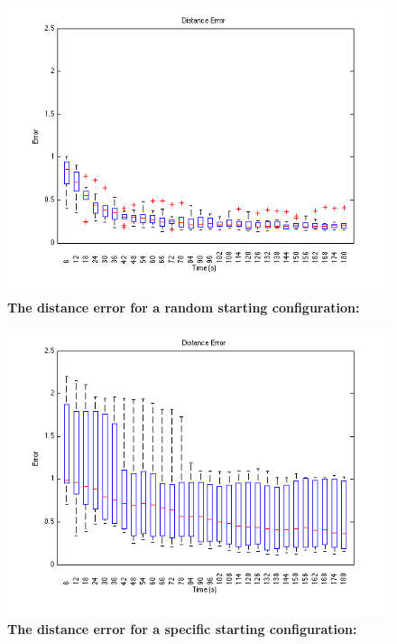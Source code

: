 \documentclass[oneside, a4paper, 12pt]{memoir}
\let\oldCaption\caption
\renewcommand{\caption}[2]{
\oldCaption[#1]{{\small\sffamily\bfseries #1:} #2}
}
\begin{document}
				\begin{figure}[!htp]
					\includegraphics[width=\textwidth]{../MATLAB/boxplot_random_distance.png}
					\caption{The distance error for a random starting configuration}{}
				\end{figure}
			
				
				\begin{figure}[!htp]
					\includegraphics[width=\textwidth]{../MATLAB/boxplot_geo2_distance.png}
					\caption{The distance error for a specific starting configuration}{}
				\end{figure}
				
\end{document}
